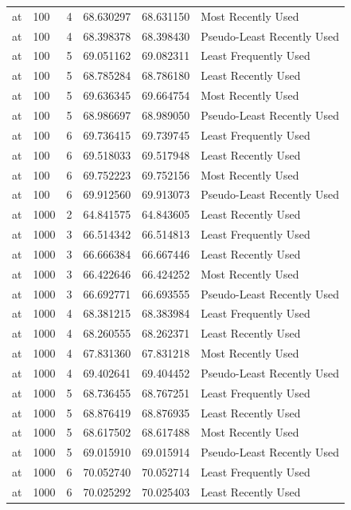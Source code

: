 \begin{tabular}{llrrrl}
at & 100 & 4 & 68.630297 & 68.631150 & Most Recently Used \\
at & 100 & 4 & 68.398378 & 68.398430 & Pseudo-Least Recently Used \\
at & 100 & 5 & 69.051162 & 69.082311 & Least Frequently Used \\
at & 100 & 5 & 68.785284 & 68.786180 & Least Recently Used \\
at & 100 & 5 & 69.636345 & 69.664754 & Most Recently Used \\
at & 100 & 5 & 68.986697 & 68.989050 & Pseudo-Least Recently Used \\
at & 100 & 6 & 69.736415 & 69.739745 & Least Frequently Used \\
at & 100 & 6 & 69.518033 & 69.517948 & Least Recently Used \\
at & 100 & 6 & 69.752223 & 69.752156 & Most Recently Used \\
at & 100 & 6 & 69.912560 & 69.913073 & Pseudo-Least Recently Used \\
at & 1000 & 2 & 64.841575 & 64.843605 & Least Recently Used \\
at & 1000 & 3 & 66.514342 & 66.514813 & Least Frequently Used \\
at & 1000 & 3 & 66.666384 & 66.667446 & Least Recently Used \\
at & 1000 & 3 & 66.422646 & 66.424252 & Most Recently Used \\
at & 1000 & 3 & 66.692771 & 66.693555 & Pseudo-Least Recently Used \\
at & 1000 & 4 & 68.381215 & 68.383984 & Least Frequently Used \\
at & 1000 & 4 & 68.260555 & 68.262371 & Least Recently Used \\
at & 1000 & 4 & 67.831360 & 67.831218 & Most Recently Used \\
at & 1000 & 4 & 69.402641 & 69.404452 & Pseudo-Least Recently Used \\
at & 1000 & 5 & 68.736455 & 68.767251 & Least Frequently Used \\
at & 1000 & 5 & 68.876419 & 68.876935 & Least Recently Used \\
at & 1000 & 5 & 68.617502 & 68.617488 & Most Recently Used \\
at & 1000 & 5 & 69.015910 & 69.015914 & Pseudo-Least Recently Used \\
at & 1000 & 6 & 70.052740 & 70.052714 & Least Frequently Used \\
at & 1000 & 6 & 70.025292 & 70.025403 & Least Recently Used \\

\end{tabular}
